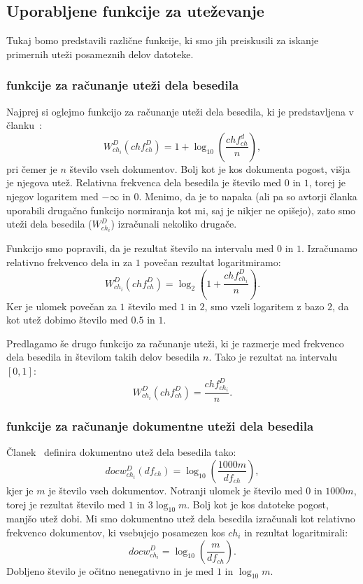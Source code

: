 \documentclass{acm_proc_article-sp}
\begin{document}
\subsection{Uporabljene funkcije za uteževanje}
\label{weight-functions}

Tukaj bomo predstavili različne funkcije, ki smo jih preiskusili za iskanje primernih uteži posameznih delov datoteke.

\subsubsection{funkcije za računanje uteži dela besedila}\label{utezivclanku}
Najprej si oglejmo funkcijo za računanje uteži dela besedila, ki je predstavljena v članku~\cite{fbhash}:
\[ W_{ch_i}^{D}(ch f_{ch}^D) = 1 + \log_{10}\left(\frac{ch f_{ch}^d}{n}\right),\]
pri čemer je $n$ število vseh dokumentov. Bolj kot je kos dokumenta pogost, višja je njegova utež. Relativna frekvenca dela besedila je število med $0$ in $1$, torej je njegov logaritem med $-\infty$ in $0$. Menimo, da je to napaka (ali pa so avtorji članka uporabili drugačno funkcijo normiranja kot mi, saj je nikjer ne opišejo), zato smo uteži dela besedila ($W_{ch_i}^{D}$) izračunali nekoliko drugače.

Funkcijo smo popravili, da je rezultat število na intervalu med $0$ in $1$. Izračunamo relativno frekvenco dela in za $1$ povečan rezultat logaritmiramo:
\[ W_{ch_i}^{D}(ch f_{ch}^D) = \log_2\left(1 + \frac{ch f_{ch_i}^D}{n}\right). \]
Ker je ulomek povečan za $1$ število med $1$ in $2$, smo vzeli logaritem z bazo $2$, da kot utež dobimo število med $0.5$ in $1$. 

Predlagamo še drugo funkcijo za računanje uteži, ki je razmerje med frekvenco dela besedila in številom takih delov besedila $n$. Tako je rezultat na intervalu $[0,1]$:
\[ W_{ch_i}^{D}(ch f_{ch}^D) = \frac{ch f_{ch_i}^D}{n}. \]

\subsubsection{funkcije za računanje dokumentne uteži dela besedila}
Članek~\cite{fbhash} definira dokumentno utež dela besedila tako:
\[ docw_{ch_i}^{D}(df_{ch}) = \log_{10}\left(\frac{1000m}{df_{ch}}\right), \]
kjer je $m$ je število vseh dokumentov. Notranji ulomek je število med $0$ in $1000m$, torej je rezultat število med $1$ in $3\log_{10}m$. Bolj kot je kos datoteke pogost, manjšo utež dobi.
Mi smo dokumentno utež dela besedila izračunali kot relativno frekvenco dokumentov, ki vsebujejo posamezen kos $ch_i$ in rezultat logaritmirali:
\[ docw_{ch_i}^{D} = \log_{10}\left(\frac{m}{df_{ch}}\right). \]
Dobljeno število je očitno nenegativno in je med $1$ in $\log_{10}m$.
\end{document}
